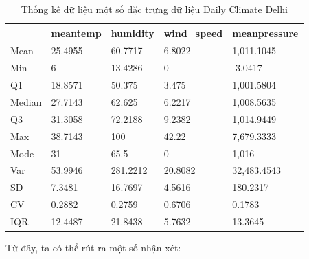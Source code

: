     \begin{table}[htbp]
    \centering
    \caption{ Thống kê dữ liệu một số đặc trưng dữ liệu Daily Climate Delhi}
    \label{tab:stat-weather}
    \begin{tabular}{|p{2cm}|p{2cm}|p{2cm}|p{2.5cm}|p{2.5cm}|}
        \hline
         & meantemp & humidity & wind\_speed & meanpressure \\
        \hline
        Mean & 25.4955 & 60.7717 & 6.8022 & 1,011.1045 \\
        \hline
        Min & 6 & 13.4286 & 0 & -3.0417 \\
        \hline
        Q1 & 18.8571 & 50.375 & 3.475 & 1,001.5804 \\
        \hline
        Median & 27.7143 & 62.625 & 6.2217 & 1,008.5635 \\
        \hline
        Q3 & 31.3058 & 72.2188 & 9.2382 & 1,014.9449 \\
        \hline
        Max & 38.7143 & 100 & 42.22 & 7,679.3333 \\
        \hline
        Mode & 31 & 65.5 & 0 & 1,016 \\
        \hline
        Var & 53.9946 & 281.2212 & 20.8082 & 32,483.4543 \\
        \hline
        SD & 7.3481 & 16.7697 & 4.5616 & 180.2317 \\
        \hline
        CV & 0.2882 & 0.2759 & 0.6706 & 0.1783 \\
        \hline
        IQR & 12.4487 & 21.8438 & 5.7632 & 13.3645 \\
        \hline
    \end{tabular}
    \end{table}

    \FloatBarrier

    Từ đây, ta có thể rút ra một số nhận xét:

